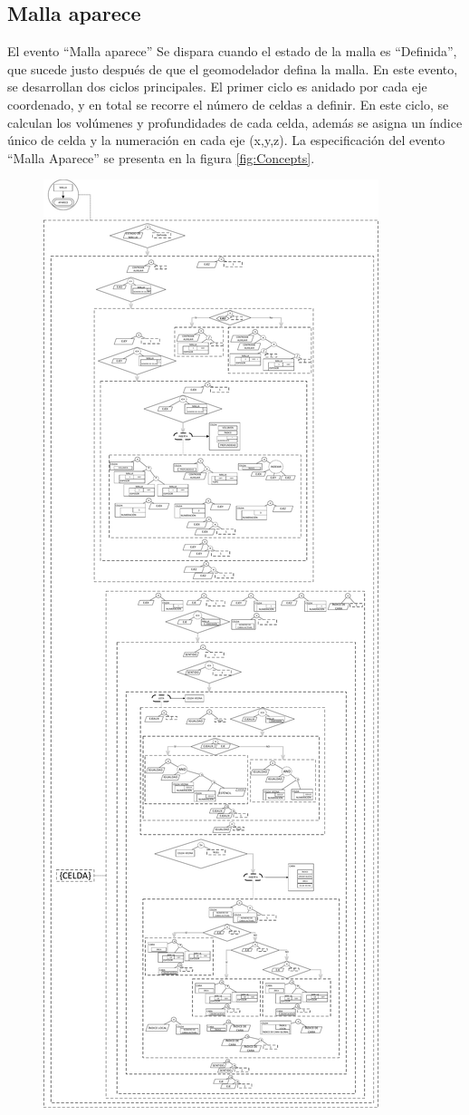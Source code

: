 \subsection{Malla aparece}\label{sec:PS_MeshAppears}
El evento ``Malla aparece'' Se dispara cuando el estado de la malla es ``Definida'', que sucede justo después de que el geomodelador defina la malla. En este evento, se desarrollan dos ciclos principales. El primer ciclo es anidado por cada eje coordenado, y en total se recorre el número de celdas a definir. En este ciclo, se calculan los volúmenes y profundidades de cada celda, además se asigna un índice único de celda y la numeración en cada eje (x,y,z). La especificación del evento ``Malla Aparece'' se presenta en la figura \ref{fig:Concepts}.\\

\begin{figure}[h]
	\centering%
	\includegraphics[height=\textheight]{Fig/MallaAparece.pdf}%

\end{figure}
